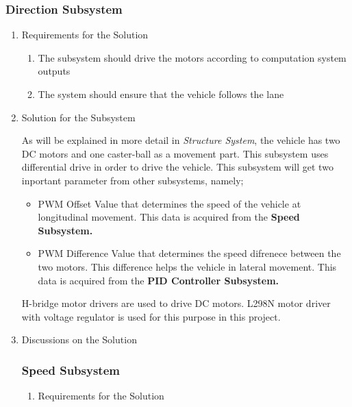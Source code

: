 \documentclass[a4paper,12pt]{article}
\begin{document}
	\subsubsection{Direction Subsystem}
		
		\begin{enumerate}
			\item {Requirements for the Solution}
			
			\begin{enumerate}
					\item The subsystem should drive the motors according to computation system outputs
					\item The system should ensure that the vehicle follows the lane 
					
				\end{enumerate}
				
			\item {Solution for the Subsystem}
			
	As will be explained in more detail in \textit{Structure System}, the vehicle has two DC motors and one caster-ball as a movement part. This subsystem uses differential drive in order to drive the vehicle. This subsystem will get two inportant parameter from other subsystems, namely;
	
	\begin{itemize}
		\item PWM Offset Value that determines the speed of the vehicle at longitudinal movement. This data is acquired from the \textbf{Speed Subsystem.} 	
		\item PWM Difference Value that determines the speed difrenece between the two motors. This difference helps the vehicle in lateral movement. This data is acquired from the \textbf{PID Controller Subsystem.} 	
	\end{itemize}	
	
	  H-bridge motor drivers are used to drive DC motors. L298N motor driver with voltage regulator is used for this purpose in this project. 
			
			\item {Discussions on the Solution}

			
	
			
		\subsubsection{Speed Subsystem}
		
		\begin{enumerate}
			\item {Requirements for the Solution}
			

\end{enumerate}
\end{enumerate}
\end{document}
